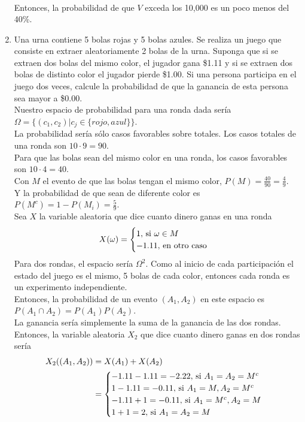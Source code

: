 \documentclass[12pt,a4paper]{report}
\begin{document}
\begin{enumerate}
{\begin{align*}
			\end{align*}
			Entonces, la probabilidad de que $V$ exceda los 10,000 es un poco
			menos del 40\%.
			}
		\item {
			Una urna contiene 5 bolas rojas y 5 bolas azules. Se realiza un juego
			que consiste en extraer aleatoriamente 2 bolas de la urna. Suponga que
			si se extraen dos bolas del mismo color, el jugador gana \$1.11 y si se
			extraen dos bolas de distinto color el jugador pierde \$1.00. Si una
			persona participa en el juego dos veces, calcule la probabilidad de que
			la ganancia de esta persona sea mayor a \$0.00.\\
			Nuestro espacio de probabilidad para una ronda dada sería
			$\Omega = \{(c_1, c_2)| c_j \in \{rojo, azul\}\}$.\\
			La probabilidad sería sólo casos favorables sobre totales.
			Los casos totales de una ronda son $10 \cdot 9 = 90$.\\
			Para que las bolas sean del mismo color en una ronda,
			los casos favorables son $10 \cdot 4 = 40$.\\
			Con $M$ el evento de que las bolas tengan el mismo color,
			$P(M) = \frac{40}{90} = \frac{4}{9}$.\\
			Y la probabilidad de que sean de diferente color es
			$P(M^c) = 1 - P(M_i) = \frac{5}{9}$.\\
			Sea $X$ la variable aleatoria que dice cuanto dinero ganas en una
			ronda
			\[
				X(\omega) = \begin{cases}
								1, $ si $ \omega \in M\\
								-1.11, $ en otro caso$
							\end{cases}
			\]
			Para dos rondas, el espacio sería $\Omega^2$.
			Como al inicio de cada participación el estado del juego es el mismo,
			5 bolas de cada color, entonces cada ronda es un experimento
			independiente.\\
			Entonces, la probabilidad de un evento $(A_1, A_2)$ en este espacio es
			$P(A_1 \cap A_2) = P(A_1)P(A_2)$.\\
			La ganancia sería simplemente la suma de la ganancia de las dos rondas.\\
			Entonces, la variable aleatoria $X_2$ que dice cuanto dinero ganas
			en dos rondas sería
			\begin{align*}
				X_2((A_1, A_2)) &= X(A_1)+X(A_2)\\
								&= \begin{cases}
									-1.11-1.11 = -2.22, $ si $ A_1 = A_2 = M^c \\
									1-1.11 = -0.11, $ si $ A_1 = M, A_2 = M^c \\
									-1.11+1 = -0.11, $ si $ A_1 = M^c, A_2 = M \\
									1+1 = 2, $ si $ A_1 = A_2 = M \\
								\end{cases}
			\end{align*}

}
\end{enumerate}
\end{document}
